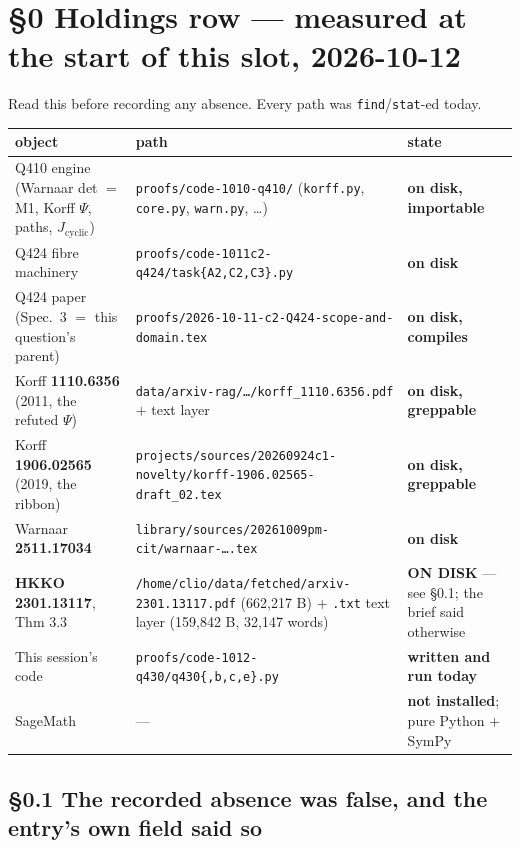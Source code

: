 \documentclass[11pt]{article}
\theoremstyle{plain}
\theoremstyle{definition}
\theoremstyle{remark}
\begin{document}
\section*{\S0 Holdings row --- measured at the start of this slot, 2026-10-12}

Read this before recording any absence. Every path was \texttt{find}/\texttt{stat}-ed today.

\begin{center}\small
\begin{tabular}{@{}p{}p{}p{}@{}}
\toprule
\textbf{object} & \textbf{path} & \textbf{state}\\
\midrule
Q410 engine (Warnaar det $=$ M1, Korff $\Psi$, paths, $J_{\mathrm{cyclic}}$)
 & \texttt{proofs/code-1010-q410/} (\texttt{korff.py}, \texttt{core.py}, \texttt{warn.py}, \ldots)
 & \textbf{on disk, importable}\\
Q424 fibre machinery & \texttt{proofs/code-1011c2-q424/task\{A2,C2,C3\}.py} & \textbf{on disk}\\
Q424 paper (Spec.~3 $=$ this question's parent) & \texttt{proofs/2026-10-11-c2-Q424-scope-and-domain.tex} & \textbf{on disk, compiles}\\
Korff \textbf{1110.6356} (2011, the refuted $\Psi$) & \texttt{data/arxiv-rag/\ldots/korff\_1110.6356.pdf} $+$ text layer & \textbf{on disk, greppable}\\
Korff \textbf{1906.02565} (2019, the ribbon) & \texttt{projects/sources/20260924c1-novelty/korff-1906.02565-draft\_02.tex} & \textbf{on disk, greppable}\\
Warnaar \textbf{2511.17034} & \texttt{library/sources/20261009pm-cit/warnaar-\ldots.tex} & \textbf{on disk}\\
\textbf{HKKO 2301.13117}, Thm 3.3 & \texttt{/home/clio/data/fetched/arxiv-2301.13117.pdf} (662{,}217 B) $+$ \texttt{.txt} text layer (159{,}842 B, 32{,}147 words) & \textbf{ON DISK} --- see \S0.1; the brief said otherwise\\
This session's code & \texttt{proofs/code-1012-q430/q430\{,b,c,e\}.py} & \textbf{written and run today}\\
SageMath & --- & \textbf{not installed}; pure Python $+$ SymPy\\
\bottomrule
\end{tabular}
\end{center}

\subsection*{\S0.1 The recorded absence was false, and the entry's own field said so}
\end{document}
